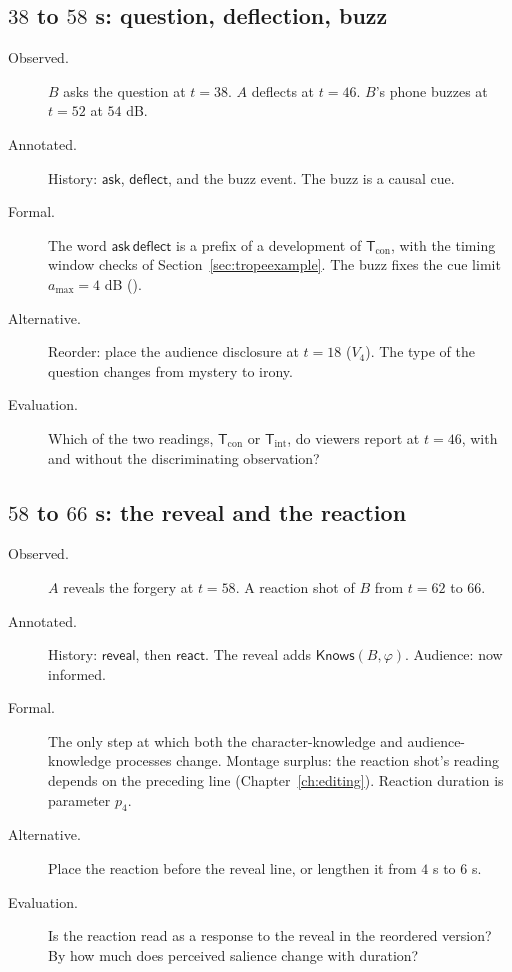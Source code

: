 \subsection*{$38$ to $58$ s: question, deflection, buzz}
\begin{description}
\item[Observed.] $B$ asks the question at $t=38$. $A$ deflects at $t=46$. $B$'s phone buzzes at $t=52$ at $54$ dB.
\item[Annotated.] History: $\mathsf{ask}$, $\mathsf{deflect}$, and the buzz event. The buzz is a causal cue.
\item[Formal.] The word $\mathsf{ask}\,\mathsf{deflect}$ is a prefix of a development of $\mathsf{T}_{\mathrm{con}}$, with the timing window checks of Section~\ref{sec:tropeexample}. The buzz fixes the cue limit $a_{\max}=4$ dB ().
\item[Alternative.] Reorder: place the audience disclosure at $t=18$ ($V_4$). The type of the question changes from mystery to irony.
\item[Evaluation.] Which of the two readings, $\mathsf{T}_{\mathrm{con}}$ or $\mathsf{T}_{\mathrm{int}}$, do viewers report at $t=46$, with and without the discriminating observation?
\end{description}

\subsection*{$58$ to $66$ s: the reveal and the reaction}
\begin{description}
\item[Observed.] $A$ reveals the forgery at $t=58$. A reaction shot of $B$ from $t=62$ to $66$.
\item[Annotated.] History: $\mathsf{reveal}$, then $\mathsf{react}$. The reveal adds $\mathsf{Knows}(B,\varphi)$. Audience: now informed.
\item[Formal.] The only step at which both the character-knowledge and audience-knowledge processes change. Montage surplus: the reaction shot's reading depends on the preceding line (Chapter~\ref{ch:editing}). Reaction duration is parameter $p_4$.
\item[Alternative.] Place the reaction before the reveal line, or lengthen it from $4$ s to $6$ s.
\item[Evaluation.] Is the reaction read as a response to the reveal in the reordered version? By how much does perceived salience change with duration?
\end{description}

